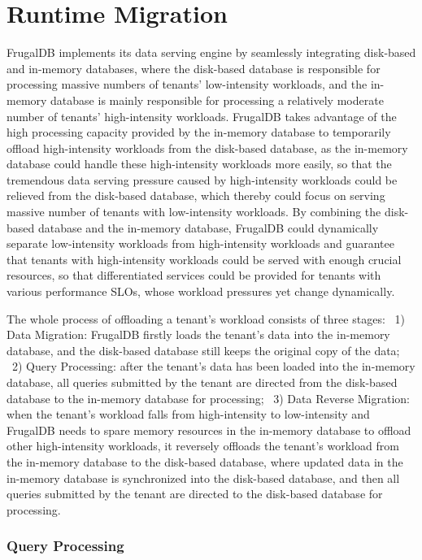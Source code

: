 \section{Runtime Migration}

FrugalDB implements its data serving engine by seamlessly integrating disk-based and in-memory databases, where the disk-based database is responsible for processing massive numbers of tenants' low-intensity workloads, and the in-memory database is mainly responsible for processing a relatively moderate number of tenants' high-intensity workloads. FrugalDB takes advantage of the high processing capacity provided by the in-memory database to temporarily offload high-intensity workloads from the disk-based database, as the in-memory database could handle these high-intensity workloads more easily, so that the tremendous data serving pressure caused by high-intensity workloads could be relieved from the disk-based database, which thereby could focus on serving massive number of tenants with low-intensity workloads. By combining the disk-based database and the in-memory database, FrugalDB could dynamically separate low-intensity workloads from high-intensity workloads and guarantee that tenants with high-intensity workloads could be served with enough crucial resources, so that differentiated services could be provided for tenants with various performance SLOs, whose workload pressures yet change dynamically.

The whole process of offloading a tenant's workload consists of three stages: ~1) Data Migration: FrugalDB firstly loads the tenant's data into the in-memory database, and the disk-based database still keeps the original copy of the data; ~2) Query Processing: after the tenant's data has been loaded into the in-memory database, all queries submitted by the tenant are directed from the disk-based database to the in-memory database for processing; ~3) Data Reverse Migration: when the tenant's workload falls from high-intensity to low-intensity and FrugalDB needs to spare memory resources in the in-memory database to offload other high-intensity workloads, it reversely offloads the tenant's workload from the in-memory database to the disk-based database, where updated data in the in-memory database is synchronized into the disk-based database, and then all queries submitted by the tenant are directed to the disk-based database for processing.

\subsubsection{Query Processing}

